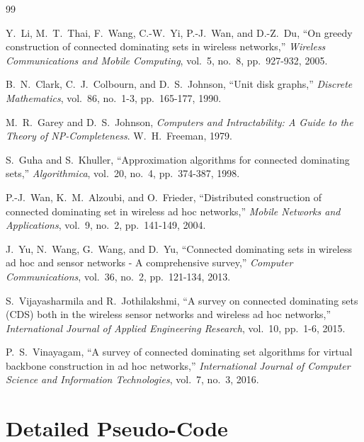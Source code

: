 \documentclass[11pt,a4paper]{article}
\begin{document}
\begin{thebibliography}{99}

Y.~Li, M.~T.~Thai, F.~Wang, C.-W.~Yi, P.-J.~Wan, and D.-Z.~Du,
``On greedy construction of connected dominating sets in wireless networks,''
\emph{Wireless Communications and Mobile Computing}, vol.~5, no.~8,
pp.~927-932, 2005.

B.~N.~Clark, C.~J.~Colbourn, and D.~S.~Johnson,
``Unit disk graphs,''
\emph{Discrete Mathematics}, vol.~86, no.~1-3, pp.~165-177, 1990.

M.~R.~Garey and D.~S.~Johnson,
\emph{Computers and Intractability: A Guide to the Theory of NP-Completeness}.
W.~H.~Freeman, 1979.

S.~Guha and S.~Khuller,
``Approximation algorithms for connected dominating sets,''
\emph{Algorithmica}, vol.~20, no.~4, pp.~374-387, 1998.

P.-J.~Wan, K.~M.~Alzoubi, and O.~Frieder,
``Distributed construction of connected dominating set in wireless ad hoc
networks,''
\emph{Mobile Networks and Applications}, vol.~9, no.~2, pp.~141-149, 2004.

J.~Yu, N.~Wang, G.~Wang, and D.~Yu,
``Connected dominating sets in wireless ad hoc and sensor networks - A
comprehensive survey,''
\emph{Computer Communications}, vol.~36, no.~2, pp.~121-134, 2013.

S.~Vijayasharmila and R.~Jothilakshmi,
``A survey on connected dominating sets (CDS) both in the wireless sensor
networks and wireless ad hoc networks,''
\emph{International Journal of Applied Engineering Research}, vol.~10,
pp.~1-6, 2015.

P.~S.~Vinayagam,
``A survey of connected dominating set algorithms for virtual backbone
construction in ad hoc networks,''
\emph{International Journal of Computer Science and Information Technologies},
vol.~7, no.~3, 2016.

\end{thebibliography}

\appendix
\section{Detailed Pseudo-Code}\label{app:pseudocode}
\end{document}

